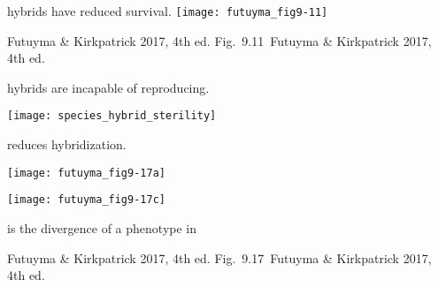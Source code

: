 \documentclass[t]{beamer}
\newcommand{\futuyma}[1]{%
	\ifthenelse{\isempty{#1}}%
	{Futuyma \& Kirkpatrick 2017, 4th ed.}%
	{Fig.~#1~Futuyma \& Kirkpatrick 2017, 4th ed.}%
}
\newcommand{\backskip}{\vspace{-0.5\baselineskip}}
\begin{document}

\begin{frame}{ hybrids have reduced survival.}
\texttt{[image: futuyma\_fig9-11]}

\vfilll

\tiny{} \hfill \futuyma{9.11}

\end{frame}


\begin{frame}{ hybrids are incapable of reproducing.}

\vspace{-\baselineskip}

\begin{center}
\texttt{[image: species\_hybrid\_sterility]}
\end{center}


\vfilll

\tiny {}
\end{frame}


\begin{frame}{ reduces hybridization.}

\backskip

\begin{multicols}{2}
\texttt{[image: futuyma\_fig9-17a]}




\columnbreak

\texttt{[image: futuyma\_fig9-17c]}




\end{multicols}

\pause 

\hangpara {} is the divergence of a phenotype in 

\tinyfill \futuyma{9.17}

\end{frame}
\end{document}
